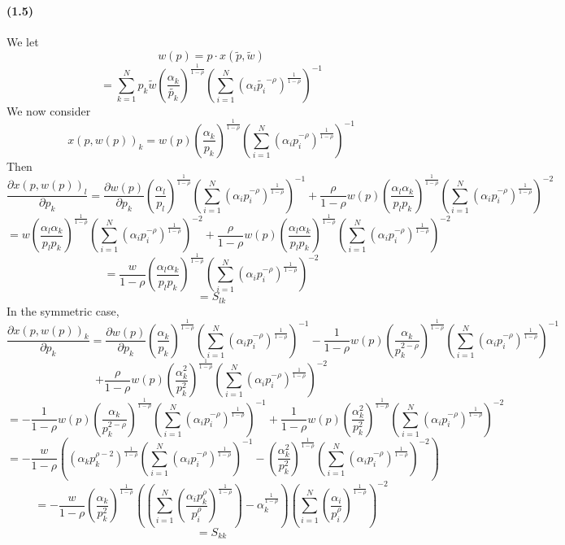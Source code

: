 \documentclass[10pt,letter]{article}
\begin{document}
\paragraph{(1.5)}
We let
\[ w(p) = p \cdot x(\tilde{p}, \tilde{w}) \]
\[ = \sum_{k=1}^N p_k \tilde{w} \left(\frac{\alpha_k}{\tilde{p_k}}\right)^{\frac{1}{1-\rho}}\left(\sum_{i=1}^N \left(\alpha_i \tilde{p_i}^{-\rho }\right)^{\frac{1}{1-\rho}} \right)^{-1} \]
We now consider
\[ x(p, w(p))_k = w(p) \left(\frac{\alpha_k}{p_k}\right)^{\frac{1}{1-\rho}}\left(\sum_{i=1}^N \left(\alpha_i p_i^{-\rho }\right)^{\frac{1}{1-\rho}} \right)^{-1} \]
Then
\[ \frac{\partial x(p, w(p))_l}{\partial p_k} = \frac{\partial w(p)}{\partial p_k} \left(\frac{\alpha_l}{p_l}\right)^{\frac{1}{1-\rho}}\left(\sum_{i=1}^N \left(\alpha_i p_i^{-\rho }\right)^{\frac{1}{1-\rho}} \right)^{-1} + \frac{\rho}{1-\rho}w(p)\left(\frac{\alpha_l\alpha_k}{p_lp_k}\right)^{\frac{1}{1-\rho}}\left(\sum_{i=1}^N \left(\alpha_i p_i^{-\rho }\right)^{\frac{1}{1-\rho}} \right)^{-2} \]
\[ = w \left(\frac{\alpha_l\alpha_k}{p_lp_k}\right)^{\frac{1}{1-\rho}}\left(\sum_{i=1}^N \left(\alpha_i p_i^{-\rho }\right)^{\frac{1}{1-\rho}} \right)^{-2} + \frac{\rho}{1-\rho}w(p)\left(\frac{\alpha_l\alpha_k}{p_lp_k}\right)^{\frac{1}{1-\rho}}\left(\sum_{i=1}^N \left(\alpha_i p_i^{-\rho }\right)^{\frac{1}{1-\rho}} \right)^{-2} \]
\[ = \frac{w}{1-\rho}\left(\frac{\alpha_l\alpha_k}{p_lp_k}\right)^{\frac{1}{1-\rho}}\left(\sum_{i=1}^N \left(\alpha_i p_i^{-\rho }\right)^{\frac{1}{1-\rho}} \right)^{-2} \]
\[ = S_{lk} \]
In the symmetric case,
\[ \frac{\partial x(p, w(p))_k}{\partial p_k} = \frac{\partial w(p)}{\partial p_k} \left(\frac{\alpha_k}{p_k}\right)^{\frac{1}{1-\rho}}\left(\sum_{i=1}^N \left(\alpha_i p_i^{-\rho }\right)^{\frac{1}{1-\rho}} \right)^{-1} - \frac{1}{1-\rho}w(p)\left(\frac{\alpha_k}{p_k^{2-\rho}}\right)^{\frac{1}{1-\rho}}\left(\sum_{i=1}^N \left(\alpha_i p_i^{-\rho }\right)^{\frac{1}{1-\rho}} \right)^{-1}\]\[ + \frac{\rho}{1-\rho}w(p)\left(\frac{\alpha_k^2}{p_k^2}\right)^{\frac{1}{1-\rho}}\left(\sum_{i=1}^N \left(\alpha_i p_i^{-\rho }\right)^{\frac{1}{1-\rho}} \right)^{-2} \]
\[ =  - \frac{1}{1-\rho}w(p)\left(\frac{\alpha_k}{p_k^{2-\rho}}\right)^{\frac{1}{1-\rho}}\left(\sum_{i=1}^N \left(\alpha_i p_i^{-\rho }\right)^{\frac{1}{1-\rho}} \right)^{-1} + \frac{1}{1-\rho}w(p)\left(\frac{\alpha_k^2}{p_k^2}\right)^{\frac{1}{1-\rho}}\left(\sum_{i=1}^N \left(\alpha_i p_i^{-\rho }\right)^{\frac{1}{1-\rho}} \right)^{-2} \]
\[  = -\frac{w}{1-\rho}\left( \left(\alpha_k p_k^{\rho-2}\right)^{\frac{1}{1-\rho}}\left(\sum_{i=1}^N \left(\alpha_i p_i^{-\rho }\right)^{\frac{1}{1-\rho}} \right)^{-1}  - \left(\frac{\alpha_k^2}{p_k^2}\right)^{\frac{1}{1-\rho}}\left(\sum_{i=1}^N \left(\alpha_i p_i^{-\rho }\right)^{\frac{1}{1-\rho}} \right)^{-2}  \right) \]
\[  = -\frac{w}{1-\rho}\left(\frac{\alpha_k}{p_k^2} \right)^{\frac{1}{1-\rho}}\left( \left(\sum_{i=1}^N \left( \frac{\alpha_i p_k^\rho}{p_i^\rho} \right)^{\frac{1}{1-\rho}} \right)  - \alpha_k^{\frac{1}{1-\rho}}  \right)\left(\sum_{i=1}^N \left(\frac{\alpha_i}{p_i^\rho }\right)^{\frac{1}{1-\rho}} \right)^{-2} \]
\[ = S_{kk} \]
\end{document}
